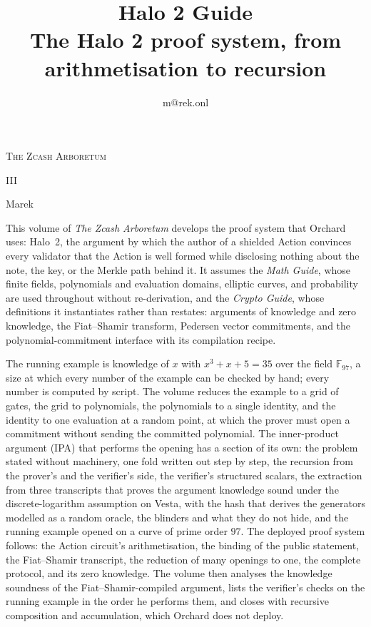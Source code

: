 \documentclass[11pt,a4paper]{article}
\title{\textbf{\Huge Halo 2 Guide}\\[6pt]\large The Halo 2 proof system, from arithmetisation to recursion}
\author{m@rek.onl}
\date{}
\makeatletter
\theoremstyle{definition}
\let\arb@tableofcontents\tableofcontents
\renewcommand{\tableofcontents}{{\hypersetup{pdfborderstyle={/S/U/W 0}}%
  \arb@tableofcontents}}
\providecommand{\accession}{}
\def\arb@name#1#2\@nil{\def\arbvolname{#2}}
\def\arb@parsetitle\textbf#1\\[#2]#3#4\@nil{\arb@name#1\@nil\def\arb@sub{#4}}
\providecommand{\arbvolname}{}
\renewcommand{\maketitle}{\expandafter\arb@parsetitle\@title\@nil
  \hypersetup{pdftitle={\arbvolname: \arb@sub},pdfauthor={Marek}}%
  \thispagestyle{empty}\begingroup\raggedright
  {\fontsize{13.2}{16}\selectfont\scshape The Zcash Arboretum\par}
  \vspace*{50mm}
  {\fontsize{47.3}{50}\selectfont\accession\par}
  \vspace{6mm}
  {\fontsize{22.8}{27}\selectfont\arbvolname\par}
  \vspace{3mm}
  {\fontsize{13.2}{17}\selectfont\arb@sub\par}
  \vspace{18mm}
  {\fontsize{13.2}{17}\selectfont Marek\par}
  {\small\@author\par}
  \endgroup\clearpage}
\newcommand{\F}{\mathbb{F}}
\renewenvironment{abstract}{%
  \small\begin{center}{\bfseries\abstractname}\end{center}\medskip\noindent\ignorespaces
}{\par\medskip}
\renewcommand{\accession}{III}
\makeatother
\begin{document}
\maketitle

\begin{abstract}
This volume of \emph{The Zcash Arboretum} develops the proof system that
Orchard uses: Halo~2, the argument by which the author of a shielded
Action convinces every validator that the Action is well formed while
disclosing nothing about the note, the key, or the Merkle path behind
it. It assumes the \emph{Math Guide}, whose finite fields, polynomials
and evaluation domains, elliptic curves, and probability are used
throughout without re-derivation, and the \emph{Crypto Guide}, whose
definitions it instantiates rather than restates: arguments of
knowledge and zero knowledge, the Fiat--Shamir transform, Pedersen
vector commitments, and the polynomial-commitment interface with its
compilation recipe.

The running example is knowledge of $x$ with $x^3 + x + 5 = 35$ over
the field $\F_{97}$, a size at which every number of the example can be
checked by hand; every number is computed by script. The volume
reduces the example to a grid of gates, the grid to polynomials, the
polynomials to a single identity, and the identity to one evaluation at
a random point, at which the prover must open a commitment without
sending the committed polynomial. The inner-product argument (IPA) that
performs the opening has a section of its own: the problem stated
without machinery, one fold written out step by step, the recursion from
the prover's and the verifier's side, the verifier's structured scalars,
the extraction from three transcripts that proves the argument knowledge
sound under the discrete-logarithm assumption on Vesta, with the hash
that derives the generators modelled as a random oracle, the blinders and
what they do not hide, and the running example opened on a curve of
prime order $97$. The deployed proof system follows: the Action
circuit's arithmetisation, the binding of the public statement, the
Fiat--Shamir transcript, the reduction of many openings to one, the
complete protocol, and its zero knowledge. The volume then analyses the
knowledge soundness of the Fiat--Shamir-compiled argument, lists the
verifier's checks on the running example in the order he performs
them, and closes with recursive composition and accumulation, which
Orchard does not deploy.
\end{abstract}
\clearpage
\tableofcontents
\clearpage
\end{document}
